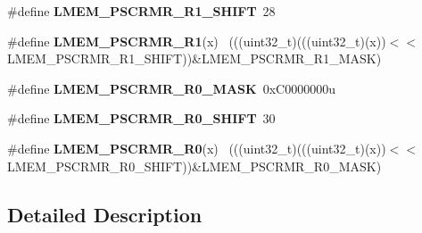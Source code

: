 \begin{DoxyCompactItemize}
\item 
\hypertarget{group___l_m_e_m___register___masks_gaff38e6fa63593adb183a07c0f663d8ee}{}\#define {\bfseries L\+M\+E\+M\+\_\+\+P\+S\+C\+R\+M\+R\+\_\+\+R1\+\_\+\+S\+H\+I\+F\+T}~28\label{group___l_m_e_m___register___masks_gaff38e6fa63593adb183a07c0f663d8ee}

\item 
\hypertarget{group___l_m_e_m___register___masks_gab169f1baacd6714951e1d3f301dc3dce}{}\#define {\bfseries L\+M\+E\+M\+\_\+\+P\+S\+C\+R\+M\+R\+\_\+\+R1}(x)                                            ~(((uint32\+\_\+t)(((uint32\+\_\+t)(x))$<$$<$L\+M\+E\+M\+\_\+\+P\+S\+C\+R\+M\+R\+\_\+\+R1\+\_\+\+S\+H\+I\+F\+T))\&L\+M\+E\+M\+\_\+\+P\+S\+C\+R\+M\+R\+\_\+\+R1\+\_\+\+M\+A\+S\+K)\label{group___l_m_e_m___register___masks_gab169f1baacd6714951e1d3f301dc3dce}

\item 
\hypertarget{group___l_m_e_m___register___masks_ga5f605f1638f3baccbd8f76b0113e0746}{}\#define {\bfseries L\+M\+E\+M\+\_\+\+P\+S\+C\+R\+M\+R\+\_\+\+R0\+\_\+\+M\+A\+S\+K}~0x\+C0000000u\label{group___l_m_e_m___register___masks_ga5f605f1638f3baccbd8f76b0113e0746}

\item 
\hypertarget{group___l_m_e_m___register___masks_gae82da84ae96e0afdbdbfe67e1e7353cb}{}\#define {\bfseries L\+M\+E\+M\+\_\+\+P\+S\+C\+R\+M\+R\+\_\+\+R0\+\_\+\+S\+H\+I\+F\+T}~30\label{group___l_m_e_m___register___masks_gae82da84ae96e0afdbdbfe67e1e7353cb}

\item 
\hypertarget{group___l_m_e_m___register___masks_ga49d89ed0405e482480913e2185a132f1}{}\#define {\bfseries L\+M\+E\+M\+\_\+\+P\+S\+C\+R\+M\+R\+\_\+\+R0}(x)                                            ~(((uint32\+\_\+t)(((uint32\+\_\+t)(x))$<$$<$L\+M\+E\+M\+\_\+\+P\+S\+C\+R\+M\+R\+\_\+\+R0\+\_\+\+S\+H\+I\+F\+T))\&L\+M\+E\+M\+\_\+\+P\+S\+C\+R\+M\+R\+\_\+\+R0\+\_\+\+M\+A\+S\+K)\label{group___l_m_e_m___register___masks_ga49d89ed0405e482480913e2185a132f1}

\end{DoxyCompactItemize}


\subsection{Detailed Description}
